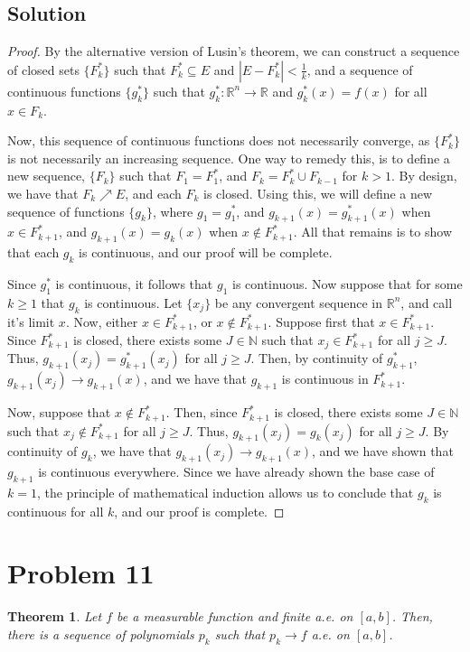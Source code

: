 \documentclass[10pt,a4paper]{article}
\theoremstyle{theorem}
\newtheorem{theorem}{Theorem}
\theoremstyle{definition}
\begin{document}
\subsection*{Solution}
\begin{proof}
By the alternative version of Lusin's theorem, we can construct a sequence of closed sets $\{F^*_k\}$ such that $F^*_k \subseteq E$ and $|E - F^*_k| < \frac{1}{k}$, and a sequence of continuous functions $\{g^*_k\}$ such that $g^*_k:\mathbb{R}^n \to \mathbb{R}$ and $g^*_k(x) = f(x)$ for all $x \in F_k$.

Now, this sequence of continuous functions does not necessarily converge, as  $\{F^*_k\}$ is not necessarily an increasing sequence. One way to remedy this, is to define a new sequence, $\{F_k\}$ such that $F_1 = F^*_1$, and $F_k = F^*_k \cup F_{k-1}$ for $k > 1$. By design, we have that $F_k \nearrow E$, and each $F_k$ is closed.  Using this, we will define a new sequence of functions $\{g_k\}$, where $g_1 = g^*_1$, and $g_{k + 1}(x) = g^*_{k+1}(x)$ when $x \in F^*_{k+1}$,  and $g_{k + 1}(x) = g_{k}(x)$ when $x \not \in F^*_{k+1}$. All that remains is to show that each $g_k$ is continuous, and our proof will be complete.

Since $g^*_1$ is continuous, it follows that $g_1$ is continuous. Now suppose that for some $k \geq 1$ that $g_k$ is continuous.  Let $\{x_j\}$ be any convergent sequence in $\mathbb{R}^n$, and call it's limit $x$. Now, either $x \in F^*_{k+1}$, or $x \not \in F^*_{k+1}$.  Suppose first that $x \in F^*_{k+1}$. Since $F^*_{k+1}$ is closed,  there exists some $J \in \mathbb{N}$ such that $x_j \in F^*_{k+1}$ for all $j \geq J$. Thus,  $g_{k+1}(x_j) = g^*_{k+1}(x_j)$ for all $j \geq J$. Then, by continuity of $g^*_{k+1}$,  $g_{k+1}(x_j) \to g_{k+1}(x)$, and we have that $g_{k+1}$ is continuous in $F^*_{k+1}$.

Now, suppose that $x \not \in F^*_{k+1}$.  Then, since $F^*_{k+1}$ is closed,  there exists some $J \in \mathbb{N}$ such that $x_j \not \in F^*_{k+1}$ for all $j \geq J$. Thus,  $g_{k+1}(x_j) = g_{k}(x_j)$ for all $j \geq J$.  By continuity of $g_k$, we have that $g_{k+1}(x_j) \to g_{k+1}(x)$, and we have shown that $g_{k+1}$ is continuous everywhere. Since we have already shown the base case of $k = 1$, the principle of mathematical induction allows us to conclude that $g_k$ is continuous for all $k$, and our proof is complete.
\end{proof}

\section*{Problem 11}
\begin{theorem}
Let $f$ be a measurable function and finite a.e.  on $[a, b]$. Then, there is a sequence of polynomials $p_k$ such that $p_k \to f$ a.e. on $[a, b]$.
\end{theorem}
\end{document}
